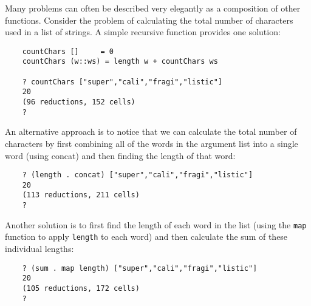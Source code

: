 Many problems can often be described very elegantly as a composition of
other functions.  Consider the problem of calculating the total  number
of characters used in a list of strings.  A simple  recursive  function
provides one solution:
\begin{verbatim}
    countChars []     = 0
    countChars (w::ws) = length w + countChars ws 

    ? countChars ["super","cali","fragi","listic"]
    20
    (96 reductions, 152 cells)
    ?
\end{verbatim}
An alternative approach is to notice that we can  calculate  the  total
number of characters by  first  combining  all  of  the  words  in  the
argument list into a single word (using concat) and  then  finding  the
length of that word:
\begin{verbatim}
    ? (length . concat) ["super","cali","fragi","listic"]
    20
    (113 reductions, 211 cells)
    ?
\end{verbatim}
Another solution is to first find the length of each word in  the  list
(using the \verb"map" function to apply \verb"length"  
to  each  word)  and  then
calculate the sum of these individual lengths:
\begin{verbatim}
    ? (sum . map length) ["super","cali","fragi","listic"]
    20
    (105 reductions, 172 cells)
    ?
\end{verbatim}


